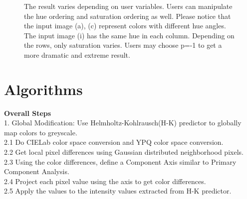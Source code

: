 \documentclass{article}
\begin{document}
\begin{figure}[t]
\begin{center}

  \end{center}
  \caption{The result varies depending on user variables. Users can manipulate the hue ordering and saturation ordering as well. Please notice that the input image (a), (c) represent colors with different hue angles. The input image (i) has the same hue in each column. Depending on the rows, only saturation varies. Users may choose p=-1 to get a more dramatic and extreme result.}
  \label{fig:ColorOrderings}
\end{figure}


\section{Algorithms}
\textbf{Overall Steps} \\
1. Global Modification: Use Helmholtz-Kohlrausch(H-K) predictor to globally map colors to greyscale. \\
2.1 Do CIELab color space conversion and YPQ color space conversion.\\
2.2 Get local pixel differences using Gaussian distributed neighborhood pixels.\\
2.3 Using the color differences, define a Component Axis similar to Primary Component Analysis. \\
2.4 Project each pixel value using the axis to get color differences.\\
2.5 Apply the values to the intensity values extracted from H-K predictor.
\end{document}
